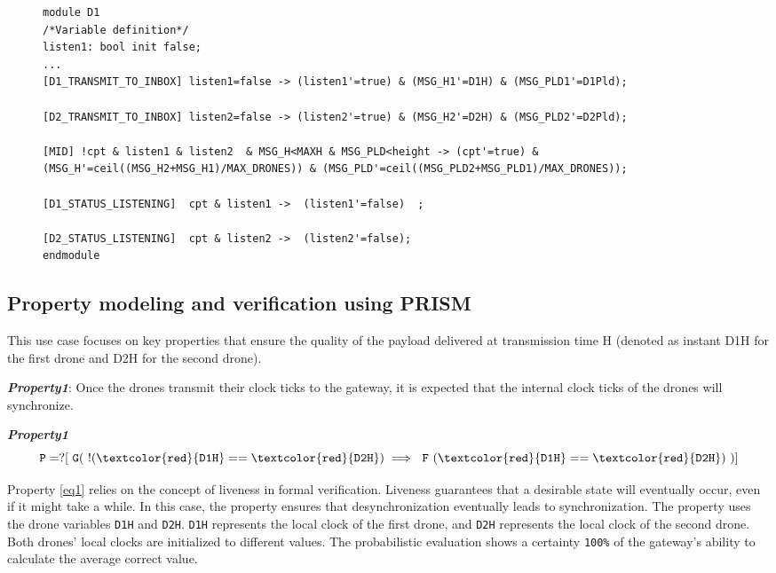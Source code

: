 \begin{figure}[!htb]            
\begin{minipage}{16.5cm}
\begin{lstlisting}[style=framed,%customc,
	caption=PRISM Code for InBox Gateway Module,
 	label=inBoxModel]	
module D1 
/*Variable definition*/
listen1: bool init false;
...
[D1_TRANSMIT_TO_INBOX] listen1=false -> (listen1'=true) & (MSG_H1'=D1H) & (MSG_PLD1'=D1Pld);

[D2_TRANSMIT_TO_INBOX] listen2=false -> (listen2'=true) & (MSG_H2'=D2H) & (MSG_PLD2'=D2Pld);

[MID] !cpt & listen1 & listen2  & MSG_H<MAXH & MSG_PLD<height -> (cpt'=true) & (MSG_H'=ceil((MSG_H2+MSG_H1)/MAX_DRONES)) & (MSG_PLD'=ceil((MSG_PLD2+MSG_PLD1)/MAX_DRONES));

[D1_STATUS_LISTENING]  cpt & listen1 ->  (listen1'=false)  ;

[D2_STATUS_LISTENING]  cpt & listen2 ->  (listen2'=false);
endmodule
\end{lstlisting}
 \end{minipage}  
\end{figure}


\subsection{Property modeling and verification using PRISM}
This use case focuses on key properties that ensure the quality of the payload delivered at transmission time H (denoted as instant D1H for the first drone and D2H for the second drone).

\begin{framed}
\emph{\bfseries{Property1}}: Once the drones transmit their clock ticks to the gateway, it is expected that the internal clock ticks of the drones will synchronize.
\end{framed}



	    \begin{resp}{\textbf{\textit{Property1}}}
        \begin{equation}
        \label{eq1}
         \mathtt{ P=? [ \ G( \ !(\textcolor{red}{D1H}==\textcolor{red}{D2H}) \implies \ F \ (\textcolor{red}{D1H}==\textcolor{red}{D2H}) \ ) ]} 
        \end{equation}
        \end{resp}
        \normalsize

Property \ref{eq1} relies on the concept of liveness in formal verification. Liveness guarantees that a desirable state will eventually occur, even if it might take a while. In this case, the property ensures that desynchronization eventually leads to synchronization. The property uses the drone variables \texttt{D1H} and \texttt{D2H}. \texttt{D1H} represents the local clock of the first drone, and \texttt{D2H} represents the local clock of the second drone. Both drones' local clocks are initialized to different values. The probabilistic evaluation shows a certainty \texttt{100\%} of the gateway's ability to calculate the average correct value.

